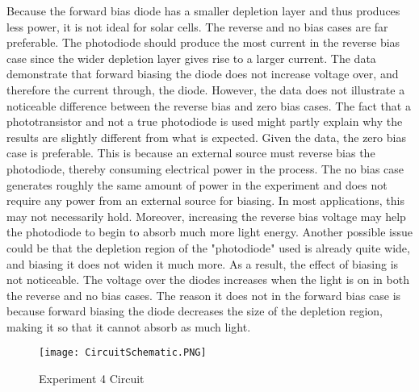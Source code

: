 Because the forward bias diode has a smaller depletion layer and thus produces less power, it is not ideal for solar cells. The reverse and no bias cases are far preferable. The photodiode should produce the most current in the reverse bias case since the wider depletion layer gives rise to a larger current. The data demonstrate that forward biasing the diode does not increase voltage over, and therefore the current through, the diode. However, the data does not illustrate a noticeable difference between the reverse bias and zero bias cases. The fact that a phototransistor and not a true photodiode is used might partly explain why the results are slightly different from what is expected. Given the data, the zero bias case is preferable. This is because an external source must reverse bias the photodiode, thereby consuming electrical power in the process. The no bias case generates roughly the same amount of power in the experiment and does not require any power from an external source for biasing.
In most applications, this may not necessarily hold. Moreover, increasing the reverse bias voltage may help the photodiode to begin to absorb much more light energy. Another possible issue could be that the depletion region of the "photodiode" used is already quite wide, and biasing it does not widen it much more. As a result, the effect of biasing is not noticeable.
The voltage over the diodes increases when the light is on in both the reverse and no bias cases. The reason it does not in the forward bias case is because forward biasing the diode decreases the size of the depletion region, making it so that it cannot absorb as much light.

\begin{figure}[h!]
	\centering
	\texttt{[image: CircuitSchematic.PNG]}
	\caption{Experiment 4 Circuit}
	\label{fig:Circuit_Pic}
\end{figure}
